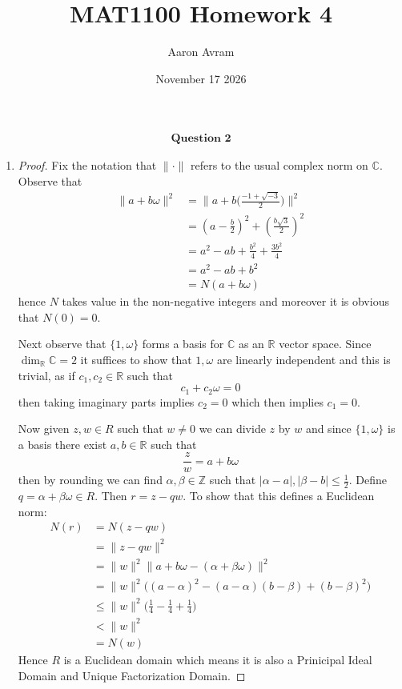 \documentclass[12pt]{article}
\title{MAT1100 Homework 4}
\author{Aaron Avram}
\date{November 17 2026}
\begin{document}
\newtheorem{definition}{Definition}
\newtheorem{theorem}{Theorem}
\newtheorem{claim}{Claim}
\newtheorem{corollary}{Corollary}

\maketitle

\begin{align*}
    \textbf{Question 2}
\end{align*}

\begin{enumerate}
    \item[(i)]
    \begin{proof}
        Fix the notation that $\| \cdot \|$ refers to the usual complex norm on $\mathbb C$.
        Observe that
        \begin{align*}
        \| a + b \omega \|^2 &= \| a + b\Big(\frac{-1 + \sqrt{-3}}{2}\Big) \|^2 \\
        &= (a - \frac{b}{2})^2 + (\frac{b\sqrt{3}}{2})^2 \\
        &= a^2 - ab + \frac{b^2}{4} + \frac{3b^2}{4} \\
        &= a^2 - ab + b^2 \\
        &= N(a + b\omega)
        \end{align*}
        hence $N$ takes value in the non-negative integers and moreover it is obvious that $N(0) = 0$.

        Next observe that $\{ 1, \omega \}$ forms a basis for $\mathbb C$
        as an $\mathbb R$ vector space. Since $\dim_{\mathbb R}\mathbb C = 2$
        it suffices to show that $1, \omega$ are linearly independent and this is trivial,
        as if $c_1, c_2 \in \mathbb R$ such that
        \[ c_1 + c_2\omega = 0 \]
        then taking imaginary parts implies $c_2 = 0$ which then implies $c_1 = 0$.

        Now given $z, w \in R$ such that $w \neq 0$ we can divide $z$ by $w$ and since $\{ 1, \omega \}$
        is a basis there exist $a, b \in \mathbb R$ such that
        \[ \frac{z}{w} = a + b\omega \]
        then by rounding we can find $\alpha, \beta \in \mathbb Z$ such that
        $|\alpha - a|, |\beta - b| \leq \frac{1}{2}$. Define $q = \alpha + \beta \omega \in R$.
        Then $r = z - qw$. To show that this defines a Euclidean norm:
        \begin{align*}
            N(r) &= N(z - qw) \\
            &= \|z - qw \|^2 \\
            &= \| w \|^2\|a + b\omega - (\alpha + \beta \omega)\|^2 \\
            &= \| w \|^2\Big((a - \alpha)^2 - (a - \alpha)(b - \beta) + (b - \beta)^2 \Big) \\
            &\leq \|w \|^2\Big(\frac{1}{4} - \frac{1}{4} + \frac{1}{4}) \\
            &< \| w \|^2 \\
            &= N(w)
        \end{align*}
        Hence $R$ is a Euclidean domain which means it is also a Prinicipal Ideal Domain and Unique Factorization Domain.
    \end{proof}


\end{enumerate}
\end{document}
